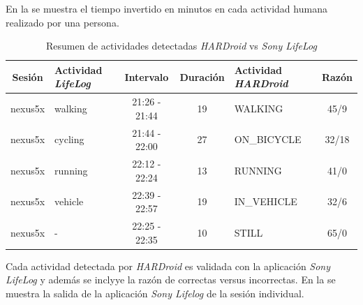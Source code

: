 En la  se muestra el tiempo invertido
en minutos en cada actividad humana realizado por una persona.

\begin{table}[h]
\begin{centering}
\begin{tabular}{|c|>{\raggedright}p{3cm}|c|c|>{\raggedright}p{3cm}|c|}
\hline 
Sesión & Actividad \emph{LifeLog} & Intervalo & Duración & Actividad \emph{HARDroid} & Razón\tabularnewline
\hline 
\hline 
nexus5x & walking & 21:26 - 21:44 & 19 & WALKING & 45/9\tabularnewline
\hline 
nexus5x & cycling & 21:44 - 22:00 & 27 & ON\_BICYCLE & 32/18\tabularnewline
\hline 
nexus5x & running & 22:12 - 22:24 & 13 & RUNNING & 41/0\tabularnewline
\hline 
nexus5x & vehicle & 22:39 - 22:57 & 19 & IN\_VEHICLE & 32/6\tabularnewline
\hline 
nexus5x & - & 22:25 - 22:35 & 10 & STILL & 65/0\tabularnewline
\hline 
\end{tabular}
\par\end{centering}
\caption[Evaluación \emph{HARDroid} vs \emph{Sony LifeLog}]{\label{tab6:vclasificacion}Resumen de actividades detectadas \emph{HARDroid}
vs\emph{ Sony LifeLog}}
\end{table}

Cada actividad detectada por \emph{HARDroid} es validada con la aplicación
\emph{Sony} \emph{LifeLog} y además se inclyye la razón de correctas
versus incorrectas. En la  se muestra la salida
de la aplicación \emph{Sony Lifelog }de la sesión individual.

